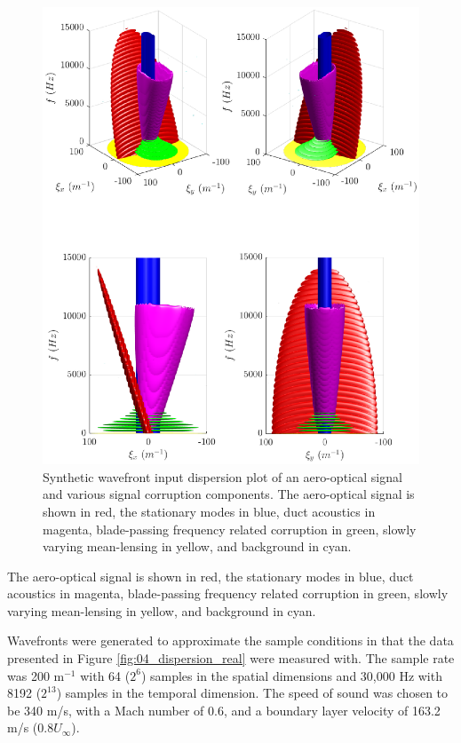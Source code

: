 \begin{figure}
 \centering
 \includegraphics{../matlab/04_basic_filtering/synthetic_wavefront.eps}
 \caption{Synthetic wavefront input dispersion plot of an aero-optical signal and various signal corruption components.  The aero-optical signal is shown in red, the stationary modes in blue, duct acoustics in magenta, blade-passing frequency related corruption in green, slowly varying mean-lensing in yellow, and background in cyan.}
 \label{fig:04_synthetic_dispersion_input}
\end{figure}
The aero-optical signal is shown in red, the stationary modes in blue, duct acoustics in magenta, blade-passing frequency related corruption in green, slowly varying mean-lensing in yellow, and background in cyan.

Wavefronts were generated to approximate the sample conditions in that the data presented in Figure \ref{fig:04_dispersion_real} were measured with.
The sample rate was 200 m$^{-1}$ with 64 ($2^6$) samples in the spatial dimensions and 30,000 Hz with 8192 ($2^{13}$) samples in the temporal dimension.
The speed of sound was chosen to be 340 m/s, with a Mach number of 0.6, and a boundary layer velocity of 163.2 m/s ($0.8U_\infty$).

